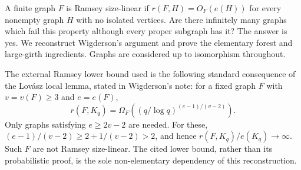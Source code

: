 A finite graph $F$ is Ramsey size-linear if $r(F,H)=O_F(e(H))$
for every nonempty graph $H$ with no isolated vertices. Are there
infinitely many graphs which fail this property although every
proper subgraph has it? The answer is yes. We reconstruct Wigderson's
argument and prove the elementary forest and large-girth ingredients.
Graphs are considered up to isomorphism throughout.

The external Ramsey lower bound used is the following standard
consequence of the Lov\'asz local lemma, stated in Wigderson's note:
for a fixed graph $F$ with $v=v(F)\geq3$ and $e=e(F)$,
\[
 r(F,K_q)=\Omega_F\left((q/\log q)^{(e-1)/(v-2)}\right).
\]
Only graphs satisfying $e\geq2v-2$ are needed. For these,
$(e-1)/(v-2)\geq2+1/(v-2)>2$, and hence
$r(F,K_q)/e(K_q)\to\infty$. Such $F$ are not Ramsey size-linear.
The cited lower bound, rather than its probabilistic proof, is
the sole non-elementary dependency of this reconstruction.
